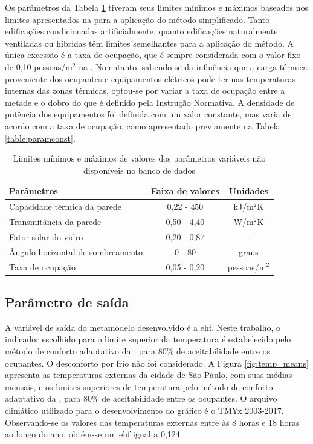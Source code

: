 Os parâmetros da Tabela \ref{table:paraminic} tiveram seus limites mínimos e máximos baseados nos limites apresentados na  para a aplicação do método simplificado. Tanto edificações condicionadas artificialmente, quanto edificações naturalmente ventiladas ou híbridas têm limites semelhantes para a aplicação do método.
A única excessão é a taxa de ocupação, que é sempre considerada com o valor fixo de 0,10 pessoas/m$^2$ na . No entanto, sabendo-se da influência que a carga térmica proveniente dos ocupantes e equipamentos elétricos pode ter nas temperaturas internas das zonas térmicas, optou-se por variar a taxa de ocupação entre a metade e o dobro do que é definido pela Instrução Normativa. A densidade de potência dos equipamentos foi definida com um valor constante, mas varia de acordo com a taxa de ocupação, como apresentado previamente na Tabela \ref{table:paramconst}.

\begin{table}[h]
	\centering
	\caption{Limites mínimos e máximos de valores dos parâmetros variáveis não disponíveis no banco de dados}
	\label{table:paraminic}
	\begin{tabular}{|l |c |c |}
		\hline
		\textbf{Parâmetros} & \textbf{Faixa de valores} & \textbf{Unidades} \\
		\hline
		Capacidade térmica da parede & 0,22 - 450 & kJ/m$^2$K \\
		\hline
		Transmitância da parede & 0,50 - 4,40 & W/m$^2$K \\
		\hline
		Fator solar do vidro & 0,20 - 0,87 & - \\
		\hline 
		Ângulo horizontal de sombreamento & 0 - 80 & graus \\
		\hline 
		Taxa de ocupação & 0,05 - 0,20 & pessoas/m$^2$ \\
		\hline 
	\end{tabular}
\end{table}

\subsection{Parâmetro de saída}

A variável de saída do metamodelo desenvolvido é a \acrfull{ehf}. Neste trabalho, o indicador escolhido para o limite superior da temperatura é estabelecido pelo método de conforto adaptativo da , para 80\% de aceitabilidade entre os ocupantes. O desconforto por frio não foi considerado.
A Figura \ref{fig:temp_means} apresenta as temperaturas externas da cidade de São Paulo, com suas médias mensais, e os limites superiores de temperatura pelo método de conforto adaptativo da , para 80\% de aceitabilidade entre os ocupantes.
O arquivo climático utilizado para o desenvolvimento do gráfico é o TMYx 2003-2017. 
Observando-se os valores das temperaturas externas entre às 8 horas e 18 horas ao longo do ano, obtém-se um \acrshort{ehf} igual a 0,124.

